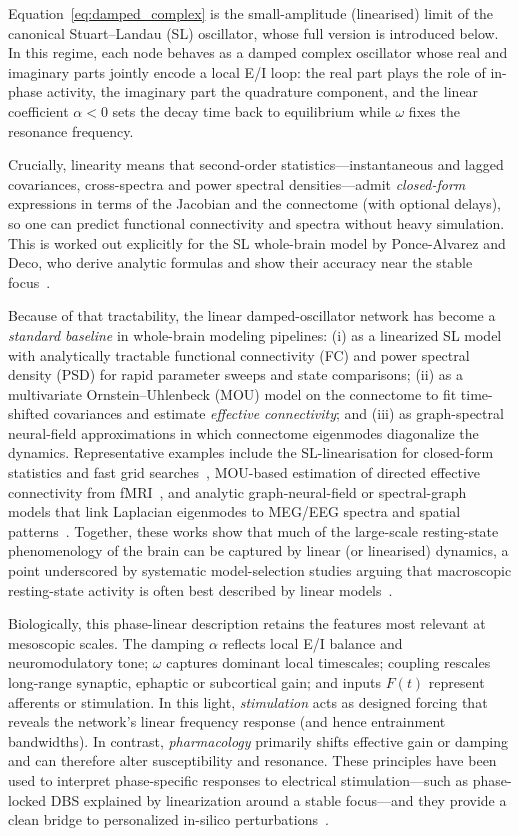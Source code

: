 \documentclass[12pt]{article}
\numberwithin{equation}{section}
\begin{document}
Equation~\eqref{eq:damped_complex} is the small-amplitude (linearised) limit of the canonical Stuart–Landau (SL) oscillator, whose full version is introduced below. In this regime, each node behaves as a damped complex oscillator whose real and imaginary parts jointly encode a local E/I loop: the real part plays the role of in-phase activity, the imaginary part the quadrature component, and the linear coefficient $\alpha <0$ sets the decay time back to equilibrium while $\omega$ fixes the resonance frequency. 


Crucially, linearity means that second-order statistics—instantaneous and lagged covariances, cross-spectra and power spectral densities—admit \emph{closed-form} expressions in terms of the Jacobian and the connectome (with optional delays), so one can predict functional connectivity and spectra without heavy simulation. This is worked out explicitly for the SL whole-brain model by Ponce-Alvarez and Deco, who derive analytic formulas and show their accuracy near the stable focus~\cite{PonceAlvarez2024}.

Because of that tractability, the linear damped-oscillator network has become a \emph{standard baseline} in whole-brain modeling pipelines: (i) as a linearized SL model with analytically tractable functional connectivity (FC) and power spectral density (PSD) for rapid parameter sweeps and state comparisons; (ii) as a multivariate Ornstein–Uhlenbeck (MOU) model on the connectome to fit time-shifted covariances and estimate \emph{effective connectivity}; and (iii) as graph-spectral neural-field approximations in which connectome eigenmodes diagonalize the dynamics. Representative examples include the SL-linearisation for closed-form statistics and fast grid searches~\cite{PonceAlvarez2024}, MOU-based estimation of directed effective connectivity from fMRI~\cite{Gilson2016}, and analytic graph-neural-field or spectral-graph models that link Laplacian eigenmodes to MEG/EEG spectra and spatial patterns~\cite{Aqil2021,Raj2020,Verma2022}. Together, these works show that much of the large-scale resting-state phenomenology of the brain can be captured by linear (or linearised) dynamics, a point underscored by systematic model-selection studies arguing that macroscopic resting-state activity is often best described by linear models~\cite{Nozari2024}. 

Biologically, this phase-linear description retains the features most relevant at mesoscopic scales. The damping $\alpha$ reflects local E/I balance and neuromodulatory tone; $\omega$ captures dominant local timescales; coupling rescales long-range synaptic, ephaptic or subcortical gain; and inputs $F(t)$ represent afferents or stimulation. In this light, \emph{stimulation} acts as designed forcing that reveals the network’s linear frequency response (and hence entrainment bandwidths). In contrast, \emph{pharmacology} primarily shifts effective gain or damping and can therefore alter susceptibility and resonance. These principles have been used to interpret phase-specific responses to electrical stimulation—such as phase-locked DBS explained by linearization around a stable focus—and they provide a clean bridge to personalized in-silico perturbations~\cite{duchetHowDesignOptimal2024}.
\end{document}
